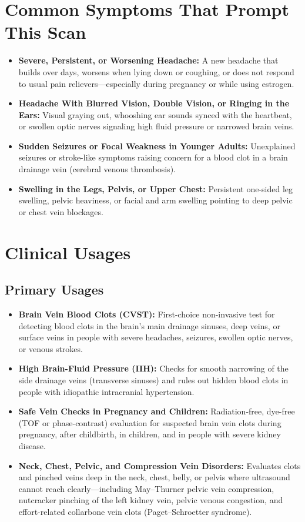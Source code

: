 \section{Common Symptoms That Prompt This Scan}
\begin{itemize}
\item \textbf{Severe, Persistent, or Worsening Headache:} A new headache that builds over days, worsens when lying down or coughing, or does not respond to usual pain relievers---especially during pregnancy or while using estrogen.
\item \textbf{Headache With Blurred Vision, Double Vision, or Ringing in the Ears:} Visual graying out, whooshing ear sounds synced with the heartbeat, or swollen optic nerves signaling high fluid pressure or narrowed brain veins.
\item \textbf{Sudden Seizures or Focal Weakness in Younger Adults:} Unexplained seizures or stroke-like symptoms raising concern for a blood clot in a brain drainage vein (cerebral venous thrombosis).
\item \textbf{Swelling in the Legs, Pelvis, or Upper Chest:} Persistent one-sided leg swelling, pelvic heaviness, or facial and arm swelling pointing to deep pelvic or chest vein blockages.
\end{itemize}

\section{Clinical Usages}

\subsection{Primary Usages}
\begin{itemize}
\item \textbf{Brain Vein Blood Clots (CVST):} First-choice non-invasive test for detecting blood clots in the brain's main drainage sinuses, deep veins, or surface veins in people with severe headaches, seizures, swollen optic nerves, or venous strokes.
\item \textbf{High Brain-Fluid Pressure (IIH):} Checks for smooth narrowing of the side drainage veins (transverse sinuses) and rules out hidden blood clots in people with idiopathic intracranial hypertension.
\item \textbf{Safe Vein Checks in Pregnancy and Children:} Radiation-free, dye-free (TOF or phase-contrast) evaluation for suspected brain vein clots during pregnancy, after childbirth, in children, and in people with severe kidney disease.
\item \textbf{Neck, Chest, Pelvic, and Compression Vein Disorders:} Evaluates clots and pinched veins deep in the neck, chest, belly, or pelvis where ultrasound cannot reach clearly---including May--Thurner pelvic vein compression, nutcracker pinching of the left kidney vein, pelvic venous congestion, and effort-related collarbone vein clots (Paget--Schroetter syndrome).
\end{itemize}


